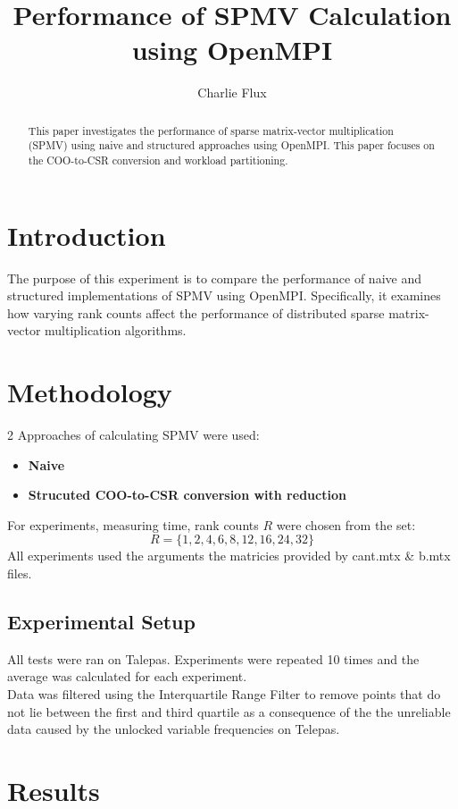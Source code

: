 \documentclass[conference]{IEEEtran}
\title{Performance of SPMV Calculation using OpenMPI}
\author{Charlie Flux}
\begin{document}
\maketitle

\begin{abstract}
This paper investigates the performance of sparse matrix-vector multiplication (SPMV) using naive and structured approaches using OpenMPI. This paper focuses on the COO-to-CSR conversion and workload partitioning. 
\end{abstract}

\section{Introduction}
The purpose of this experiment is to compare the performance of naive and structured implementations of SPMV using OpenMPI. Specifically, it examines how varying rank counts affect the performance of distributed sparse matrix-vector multiplication algorithms.
\section{Methodology}
2 Approaches of calculating SPMV were used:
\begin{itemize}
    \item \textbf{Naive}
    \item \textbf{Strucuted COO-to-CSR conversion with reduction} 
\end{itemize}

For experiments, measuring time, rank counts \(R\) were chosen from the set:
    \[
    R = \{1, 2, 4, 6, 8, 12, 16, 24, 32\}
    \]
All experiments used the arguments the matricies provided by cant.mtx \& b.mtx files.
\subsection{Experimental Setup}
All tests were ran on Talepas. Experiments were repeated 10 times and the average was calculated for each experiment. \\
Data was filtered using the Interquartile Range Filter to remove points that do not lie between the first and third quartile as a consequence of the the unreliable data caused by the unlocked variable frequencies on Telepas.

\section{Results}
\end{document}
